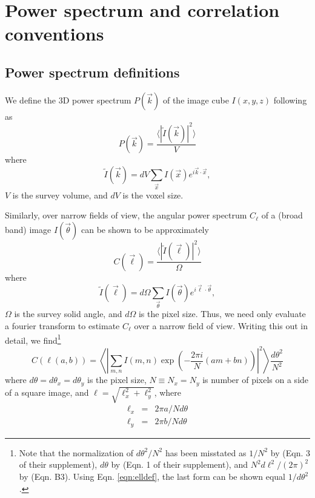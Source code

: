 \documentclass{emulateapj}
\begin{document}
\section{Power spectrum and correlation conventions}
\label{sec:pspecconventions}

\subsection{Power spectrum definitions}

We define the 3D power spectrum $P(\vec{k})$ of the image cube $I(x,y,z)$ following \citet{ewallwice14} as 
\begin{equation}
	P(\vec{k}) = \frac{\langle|\tilde{I}(\vec{k})|^2\rangle}{V}
\end{equation}
where
\begin{equation}
	\tilde{I}(\vec{k})=dV\sum_{\vec{x}}I(\vec{x})e^{i\vec{k}\cdot\vec{x}},
\end{equation}
$V$ is the survey volume, and $dV$ is the voxel size.

Similarly, over narrow fields of view, the angular power spectrum $C_\ell$ of a (broad band) image $I(\vec{\theta})$ can be shown to be approximately
\begin{equation}
\label{eqn:Cldef0}
	C(\vec{\ell}) = \frac{\langle|\tilde{I}(\vec{\ell})|^2\rangle}{\Omega} 
\end{equation}
where
\begin{equation}
	\tilde{I}(\vec{\ell})=d\Omega\sum_{\vec{\theta}}I(\vec{\theta})e^{i\vec{\ell}\cdot\vec{\theta}},
\end{equation}
$\Omega$ is the survey solid angle, and $d\Omega$ is the pixel size. Thus, we need only evaluate a fourier transform to estimate $C_\ell$ over a narrow field of view. Writing this out in detail, we find\footnote{Note that the normalization of $d\theta^2/N^2$ has been misstated as $1/N^2$ by \citet{zemcov14} (Eqn. 3 of their supplement), $d\theta$ by \citet{cooray12} (Eqn. 1 of their supplement), and $N^2d\ell^2/(2\pi)^2$ by \citet{thacker15} (Eqn. B3). Using Eqn. \ref{eqn:elldef}, the last form can be shown equal $1/d\theta^2$.} 
\begin{equation}
\label{eqn:Cldef}
	C(\ell(a,b))=\left\langle\left|\sum_{m,n}I(m,n)\exp\left(-\frac{2\pi i}{N}  (am+bn)\right)\right|^2\right\rangle\frac{d\theta^2}{N^2}
\end{equation}
where $d\theta=d\theta_x=d\theta_y$ is the pixel size, $N\equiv N_x=N_y$ is number of pixels on a side of a square image, and $\ell=\sqrt{\ell_x^2+\ell_y^2}$, where 
\begin{eqnarray}
\ell_x&=&2\pi a/N d\theta \label{eqn:elldef}\\
\ell_y&=&2\pi b/Nd\theta \label{eqn:elldef2}
\end{eqnarray}
\end{document}
